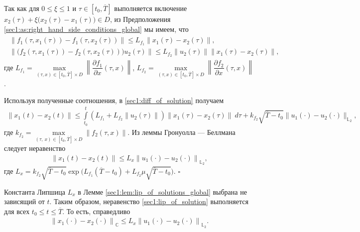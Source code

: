 \documentclass[../main.tex]{subfiles}
\begin{document}
Так как для $0 \leqslant \xi \leqslant 1 $ и  $\tau \in [t_0,\overline{T}]$ выполняется включение $x_2(\tau) + \xi \big(x_2(\tau) - x_1(\tau)\big) \in D$, из Предположения \ref{sec1:as:right_hand_side_conditions_global} мы имеем, что 
\begin{gather}\label{sec1:lip_f}
\begin{gathered}
     \big\| f_1(\tau, x_1(\tau)) - f_1(\tau, x_2(\tau)) \big\| \leqslant L_{f_1} \|x_1(\tau) - x_2(\tau)\|, \\
     \left\| \Big(f_2(\tau, x_1(\tau)) - f_2(\tau, x_2(\tau)) \Big) u_2(\tau) \right\| \leqslant  L_{f_2} \|u_2(\tau)\| \|x_1(\tau) - x_2(\tau)\|,
 \end{gathered}
\end{gather}
где  $L_{f_1} = \max\limits_{(\tau, x ) \in  [t_0, \overline{T}] \times D} \left\| \dfrac{\partial f_1}{\partial x} (\tau, x) \right\| $, $L_{f_2} = \max\limits_{(\tau, x ) \in  [t_0, \overline{T}] \times D}  \left\| \dfrac{\partial f_2}{\partial x} (\tau, x) \right\|$ .
      
Используя полученные соотношения, в \eqref{sec1:diff_of_solution} получаем
\begin{gather*}
      \| x_1(t) - x_2(t) \| \leqslant \int\limits_{t_0}^{t} (L_{f_1} + L_{f_2} \| u_2(\tau)\|)  \|x_1(\tau) - x_2(\tau)\| \ d\tau +  k_{f_2} \sqrt{\overline{T} - t_0} \| u_1(\cdot) - u_2(\cdot) \|_{\mathbb{L}_2},
\end{gather*}
где $ k_{f_2} = \max\limits_{(\tau,\, x ) \in  [t_0, \overline{T}] \times D}  \|  f_2 (\tau, x) \| $.
Из леммы Гронуолла — Беллмана \cite{Bellman} следует неравенство
\begin{gather}\label{sec1:lip_of_solution}
      \left\| x_1(t) - x_2(t) \right\| \leqslant L_x \left\|u_1(\cdot) - u_2(\cdot) \right\|_{\mathbb{L}_2}, 
\end{gather}
где $L_x = k_{f_2} \sqrt{\overline{T} - t_0}  \exp\big(L_{f_1}(\overline{T} - t_0)  + L_{f_2}  \mu\sqrt{\overline{T} - t_0}\big)$.
\hfill $\square$
\begin{zam}
Константа Липшица $L_x$ в Лемме \ref{sec1:lem:lip_of_solutions_global} выбрана не зависящий от $t$.
Таким образом, неравенство \eqref{sec1:lip_of_solution} выполняется для всех $t_0 \leqslant t \leqslant \overline{T}$.
То есть, справедливо 
\begin{gather}
    \left\| x_1(\cdot) - x_2(\cdot) \right\|_\mathbb{C} \leqslant L_x \left\|u_1(\cdot) - u_2(\cdot) \right\|_{\mathbb{L}_2}.
\end{gather}
\end{zam}
    
\end{document}
